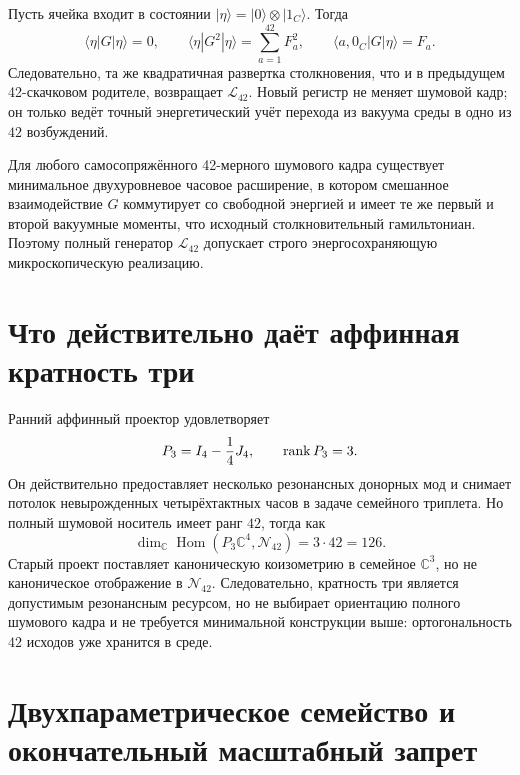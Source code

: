 Пусть ячейка входит в состоянии
$|\eta\rangle=|0\rangle\otimes|1_C\rangle$. Тогда
\begin{equation}
 \langle\eta|G|\eta\rangle=0,
 \qquad
 \langle\eta|G^2|\eta\rangle=\sum_{a=1}^{42}F_a^2,
 \qquad
 \langle a,0_C|G|\eta\rangle=F_a.
 \label{eq:v8-mixed-parent-moments}
\end{equation}
Следовательно, та же квадратичная развертка столкновения, что и в
предыдущем 42-скачковом родителе, возвращает $\mathcal L_{42}$. Новый
регистр не меняет шумовой кадр; он только ведёт точный энергетический учёт
перехода из вакуума среды в одно из $42$ возбуждений.

\begin{theorem}
Для любого самосопряжённого 42-мерного шумового кадра существует
минимальное двухуровневое часовое расширение, в котором смешанное
взаимодействие $G$ коммутирует со свободной энергией и имеет те же первый и
второй вакуумные моменты, что исходный столкновительный гамильтониан.
Поэтому полный генератор $\mathcal L_{42}$ допускает строго
энергосохраняющую микроскопическую реализацию.
\end{theorem}

\section{Что действительно даёт аффинная кратность три}

Ранний аффинный проектор удовлетворяет
\begin{equation}
 P_3=I_4-\frac14J_4,
 \qquad \operatorname{rank} P_3=3.
 \label{eq:v8-mixed-parent-affine-rank}
\end{equation}
Он действительно предоставляет несколько резонансных донорных мод и
снимает потолок невырожденных четырёхтактных часов в задаче семейного
триплета. Но полный шумовой носитель имеет ранг $42$, тогда как
\begin{equation}
 \dim_{\mathbb C}\operatorname{Hom}
 \left(P_3\mathbb C^4,\mathcal N_{42}\right)=3\cdot42=126.
 \label{eq:v8-mixed-parent-affine-map-freedom}
\end{equation}
Старый проект поставляет каноническую коизометрию в семейное
$\mathbb C^3$, но не каноническое отображение в $\mathcal N_{42}$.
Следовательно, кратность три является допустимым резонансным ресурсом, но
не выбирает ориентацию полного шумового кадра и не требуется минимальной
конструкции выше: ортогональность $42$ исходов уже хранится в среде.

\section{Двухпараметрическое семейство и окончательный масштабный запрет}

